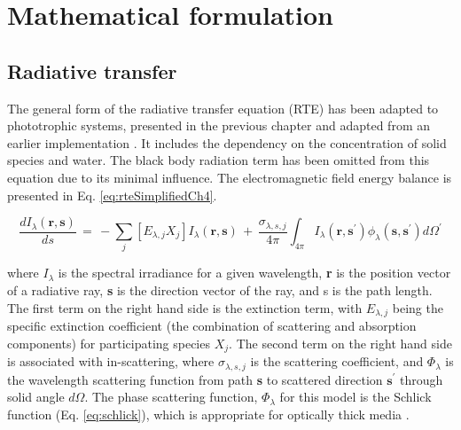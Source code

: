 


\newpage
\section{Mathematical formulation}
\label{S:formulation}
\subsection{Radiative transfer}
The general form of the radiative transfer equation (RTE) has been adapted to phototrophic systems, presented in the previous chapter and adapted from an earlier implementation \cite{kong2014}. 
It includes the dependency on the concentration of solid species and water. 
The black body radiation term has been omitted from this equation due to its minimal influence. 
The electromagnetic field energy balance is presented in Eq. \eqref{eq:rteSimplifiedCh4}. 

\begin{equation}
\frac{dI_\lambda (\textbf{r}, \textbf{s})}{ds} \, = \, - \sum_{j} [E_{\lambda,j} X_j] I_\lambda (\textbf{r}, \textbf{s})\, +\, \frac{\sigma_{\lambda, s, j}}{4 \pi} \int_{4 \pi} I_\lambda (\textbf{r}, \textbf{s}^\prime) \phi_\lambda(\textbf{s}, \textbf{s}^\prime) d\Omega^\prime
\label{eq:rteSimplifiedCh4}
    \end{equation}

where $I_\lambda$ is the spectral irradiance for a given wavelength, \textbf{r} is the position vector of a radiative ray, \textbf{s} is the direction vector of the ray, and s is the path length. The first term on the right hand side is the extinction term, with $E_{\lambda, j}$ being the specific extinction coefficient (the combination of scattering and absorption components) for participating species $X_j$. The second term on the right hand side is associated with in-scattering, where $\sigma_{\lambda, s, j}$ is the scattering coefficient, and $\Phi_\lambda$ is the wavelength scattering function from path \textbf{s} to scattered direction $\textbf{s}^\prime$ through solid angle $d\Omega$. The phase scattering function, $\Phi_\lambda$ for this model is the Schlick function (Eq. \ref{eq:schlick}), which is appropriate for optically thick media \cite{jarosz2008}. 


